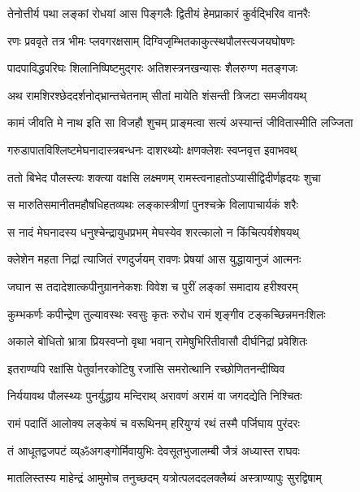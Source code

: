 \twolineshloka
{तेनोत्तीर्य पथा लङ्कां रोधयां आस पिङ्गलैः}
{द्वितीयं हेमप्राकारं कुर्वद्भिरिव वानरैः}%

\twolineshloka
{रणः प्रववृते तत्र भीमः प्लवगरक्षसाम्}
{दिग्विजृम्भितकाकुत्स्थपौलस्त्यजयघोषणः}%

\twolineshloka
{पादपाविद्धपरिघः शिलानिष्पिष्टमुद्गरः}
{अतिशस्त्रनखन्यासः शैलरुग्ण मतङ्गजः}%

\twolineshloka
{अथ रामशिरश्छेददर्शनोद्भ्रान्तचेतनाम्}
{सीतां मायेति शंसन्ती त्रिजटा समजीवयथ्}%

\twolineshloka
{कामं जीवति मे नाथ इति सा विजहौ शुचम्}
{प्राङ्मत्वा सत्यं अस्यान्तं जीवितास्मीति लज्जिता}%

\twolineshloka
{गरुडापातविश्लिष्टमेघनादास्त्रबन्धनः}
{दाशरथ्योः क्षणक्लेशः स्वप्नवृत्त इवाभवथ्}%

\twolineshloka
{ततो बिभेद पौलस्त्यः शक्त्या वक्षसि लक्ष्मणम्}
{रामस्त्वनाहतोऽप्यासीद्विदीर्णहृदयः शुचा}%

\twolineshloka
{स मारुतिसमानीतमहौषधिहतव्यथः}
{लङ्कास्त्रीणां पुनश्चक्रे विलापाचार्यकं शरैः}%

\twolineshloka
{स नादं मेघनादस्य धनुश्चेन्द्रायुधप्रभम्}
{मेघस्येव शरत्कालो न किंचित्पर्यशेषयथ्}%

\twolineshloka
{क्लेशेन महता निद्रां त्याजितं रणदुर्जयम्}
{रावणः प्रेषयां आस युद्धायानुजं आत्मनः}%

\twolineshloka
{जघान स तदादेशात्कपीनुग्राननेकशः}
{विवेश च पुरीं लङ्कां समादाय हरीश्वरम्}%

\twolineshloka
{कुम्भकर्णः कपीन्द्रेण तुल्यावस्थः स्वसुः कृतः}
{रुरोध रामं शृङ्गीव टङ्कच्छिन्नमनःशिलः}%

\twolineshloka
{अकाले बोधितो भ्रात्रा प्रियस्वप्नो वृथा भवान्}
{रामेषुभिरितीवासौ दीर्घनिद्रां प्रवेशितः}%

\twolineshloka
{इतराण्यपि रक्षांसि पेतुर्वानरकोटिषु}
{रजांसि समरोत्थानि रच्छोणितनन्दीष्विव}%

\twolineshloka
{निर्ययावथ पौलस्थ्यः पुनर्युद्धाय मन्दिराथ्}
{अरावणं अरामं वा जगदद्येति निश्चितः}%

\twolineshloka
{रामं पदातिं आलोक्य लङ्केषं च वरूथिनम्}
{हरियुग्यं रथं तस्मै पर्जिघाय पुरंदरः}%

\twolineshloka
{तं आधूतद्वजपटं व्य्ॐअगङ्गोर्मिवायुभिः}
{देवसूतभुजालम्बी जैत्रं अध्यास्त राघवः}%

\twolineshloka
{मातलिस्तस्य माहेन्द्रं आमुमोच तनुच्छदम्}
{यत्रोत्पलददलक्लैब्यं अस्त्राण्यापुः सुरद्विषाम्}%

